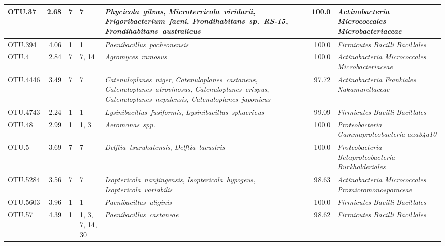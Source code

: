 \begin{ThreePartTable}
\begin{longtable}{P{1.5cm}rP{1cm}P{1.5cm}P{4cm}rP{5cm}}
OTU.37 & 2.68 & 7 & 7&\mbox{\textit{Phycicola gilvus}}, \mbox{\textit{Microterricola viridarii}}, \mbox{\textit{Frigoribacterium faeni}}, \mbox{\textit{Frondihabitans sp. RS-15}}, \mbox{\textit{Frondihabitans australicus}} & 100.0 & \mbox{\textit{Actinobacteria}} \mbox{\textit{Micrococcales}} \mbox{\textit{Microbacteriaceae}} \\ \midrule
OTU.394 & 4.06 & 1 & 1&\mbox{\textit{Paenibacillus pocheonensis}} & 100.0 & \mbox{\textit{Firmicutes}} \mbox{\textit{Bacilli}} \mbox{\textit{Bacillales}} \\ \midrule
OTU.4 & 2.84 & 7 & 7, 14&\mbox{\textit{Agromyces ramosus}} & 100.0 & \mbox{\textit{Actinobacteria}} \mbox{\textit{Micrococcales}} \mbox{\textit{Microbacteriaceae}} \\ \midrule
OTU.4446 & 3.49 & 7 & 7&\mbox{\textit{Catenuloplanes niger}}, \mbox{\textit{Catenuloplanes castaneus}}, \mbox{\textit{Catenuloplanes atrovinosus}}, \mbox{\textit{Catenuloplanes crispus}}, \mbox{\textit{Catenuloplanes nepalensis}}, \mbox{\textit{Catenuloplanes japonicus}} & 97.72 & \mbox{\textit{Actinobacteria}} \mbox{\textit{Frankiales}} \mbox{\textit{Nakamurellaceae}} \\ \midrule
OTU.4743 & 2.24 & 1 & 1&\mbox{\textit{Lysinibacillus fusiformis}}, \mbox{\textit{Lysinibacillus sphaericus}} & 99.09 & \mbox{\textit{Firmicutes}} \mbox{\textit{Bacilli}} \mbox{\textit{Bacillales}} \\ \midrule
OTU.48 & 2.99 & 1 & 1, 3&\mbox{\textit{Aeromonas spp.}} & 100.0 & \mbox{\textit{Proteobacteria}} \mbox{\textit{Gammaproteobacteria}} \mbox{\textit{aaa34a10}} \\ \midrule
OTU.5 & 3.69 & 7 & 7&\mbox{\textit{Delftia tsuruhatensis}}, \mbox{\textit{Delftia lacustris}} & 100.0 & \mbox{\textit{Proteobacteria}} \mbox{\textit{Betaproteobacteria}} \mbox{\textit{Burkholderiales}} \\ \midrule
OTU.5284 & 3.56 & 7 & 7&\mbox{\textit{Isoptericola nanjingensis}}, \mbox{\textit{Isoptericola hypogeus}}, \mbox{\textit{Isoptericola variabilis}} & 98.63 & \mbox{\textit{Actinobacteria}} \mbox{\textit{Micrococcales}} \mbox{\textit{Promicromonosporaceae}} \\ \midrule
OTU.5603 & 3.96 & 1 & 1&\mbox{\textit{Paenibacillus uliginis}} & 100.0 & \mbox{\textit{Firmicutes}} \mbox{\textit{Bacilli}} \mbox{\textit{Bacillales}} \\ \midrule
OTU.57 & 4.39 & 1 & 1, 3, 7, 14, 30&\mbox{\textit{Paenibacillus castaneae}} & 98.62 & \mbox{\textit{Firmicutes}} \mbox{\textit{Bacilli}} \mbox{\textit{Bacillales}} \\ \midrule

\end{longtable}
\end{ThreePartTable}

